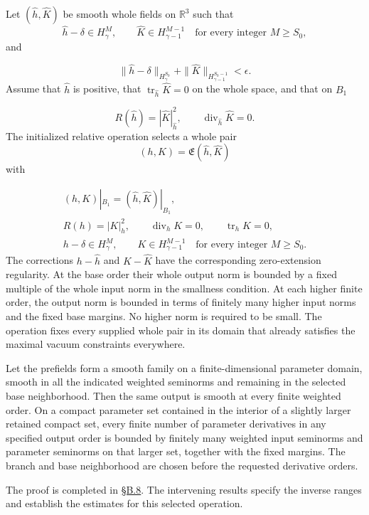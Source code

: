 \documentclass[
  english,
  11pt,
  reqno]{amsart}
\begin{document}
Let \((\widehat h,\widehat K)\) be smooth whole fields on
\(\mathbb R^3\) such that \[
\widehat h-\delta\in H^M_\gamma,
\qquad
\widehat K\in H^{M-1}_{\gamma-1}
\quad\text{for every integer }M\ge S_0,
\] and

\label{eq:online-extension-base-smallness} \[
\|\widehat h-\delta\|_{H^{S_0}_\gamma}
+\|\widehat K\|_{H^{S_0-1}_{\gamma-1}}<\epsilon.
\] Assume that \(\widehat h\) is positive, that
\(\operatorname{tr}_{\widehat h}\widehat K=0\) on the whole space, and
that on \(B_1\)

\label{eq:online-extension-local-constraint-input} \[
R(\widehat h)=|\widehat K|_{\widehat h}^2,
\qquad
\operatorname{div}_{\widehat h}\widehat K=0.
\] The initialized relative operation selects a whole pair \[
(h,K)=\mathfrak E(\widehat h,\widehat K)
\] with

\label{eq:online-extension-output-contract} \[
\begin{gathered}
(h,K)|_{B_1}=(\widehat h,\widehat K)|_{B_1},\\
R(h)=|K|_h^2,
\qquad \operatorname{div}_hK=0,
\qquad \operatorname{tr}_hK=0,\\
h-\delta\in H^M_\gamma,
\qquad K\in H^{M-1}_{\gamma-1}
\quad\text{for every integer }M\ge S_0.
\end{gathered}
\] The corrections \(h-\widehat h\) and \(K-\widehat K\) have the
corresponding zero-extension regularity. At the base order their whole
output norm is bounded by a fixed multiple of the whole input norm in
the smallness condition. At each higher finite order, the output norm is
bounded in terms of finitely many higher input norms and the fixed base
margins. No higher norm is required to be small. The operation fixes
every supplied whole pair in its domain that already satisfies the
maximal vacuum constraints everywhere.

Let the prefields form a smooth family on a finite-dimensional parameter
domain, smooth in all the indicated weighted seminorms and remaining in
the selected base neighborhood. Then the same output is smooth at every
finite weighted order. On a compact parameter set contained in the
interior of a slightly larger retained compact set, every finite number
of parameter derivatives in any specified output order is bounded by
finitely many weighted input seminorms and parameter seminorms on that
larger set, together with the fixed margins. The branch and base
neighborhood are chosen before the requested derivative orders.

The proof is completed in
\hyperref[sec:online-extension-proof-of-smooth-theorem]{§B.8}. The
intervening results specify the inverse ranges and establish the
estimates for this selected operation.
\end{document}
